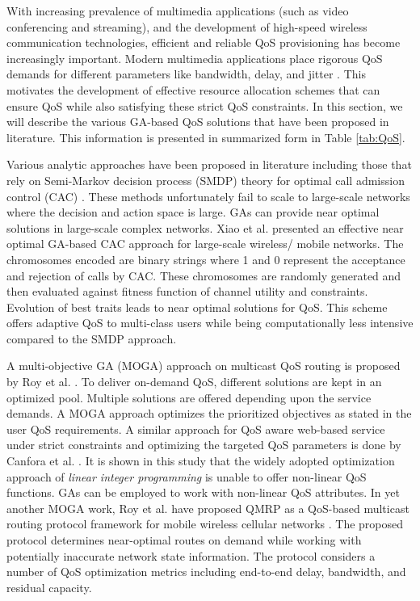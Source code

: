 \documentclass[journal]{IEEEtran}
\begin{document}
With increasing prevalence of multimedia applications (such as video conferencing and streaming), and the development of high-speed wireless communication technologies, efficient and reliable QoS provisioning has become increasingly important. Modern multimedia applications place rigorous QoS demands for different parameters like bandwidth, delay, and jitter \cite{malik2014qos}. This motivates the development of effective resource allocation schemes that can ensure QoS while also satisfying these strict QoS constraints. In this section, we will describe the various GA-based QoS solutions that have been proposed in literature. This information is presented in summarized form in Table \ref{tab:QoS}.

Various analytic approaches have been proposed in literature including those that rely on Semi-Markov decision process (SMDP) theory for optimal call admission control (CAC) \cite{choi2000call}. These methods unfortunately fail to scale to large-scale networks where the decision and action space is large. GAs can provide near optimal solutions in large-scale complex networks. 
Xiao et al. \cite{xiao2000near} presented an effective near optimal GA-based CAC approach for large-scale wireless/ mobile networks. The chromosomes encoded are binary strings where 1 and 0 represent the acceptance and rejection of calls by CAC. These chromosomes are randomly generated and then evaluated against fitness function of channel utility and constraints. Evolution of best traits leads to near optimal solutions for QoS. This scheme offers adaptive QoS to multi-class users while being computationally less intensive compared to the SMDP approach.

A multi-objective GA (MOGA) approach on multicast QoS routing is proposed by Roy et al. \cite{roy2002efficient}. To deliver on-demand QoS, different solutions are kept in an optimized pool. Multiple solutions are offered depending upon the service demands. A MOGA approach optimizes the prioritized objectives as stated in the user QoS requirements. A similar approach for QoS aware web-based service under strict constraints and optimizing the targeted QoS parameters is done by Canfora et al. \cite{canfora2005approach}. It is shown in this study that the widely adopted optimization approach of \emph{linear integer programming} is unable to offer non-linear QoS functions. GAs can be employed to work with non-linear QoS attributes. In yet another MOGA work, Roy et al. have proposed QMRP as a QoS-based multicast routing protocol framework for mobile wireless cellular networks \cite{roy2004qm2rp}. The proposed protocol determines near-optimal routes on demand while working with potentially inaccurate network state information. The protocol considers a number of QoS optimization metrics including end-to-end delay, bandwidth, and residual capacity. 
\end{document}
